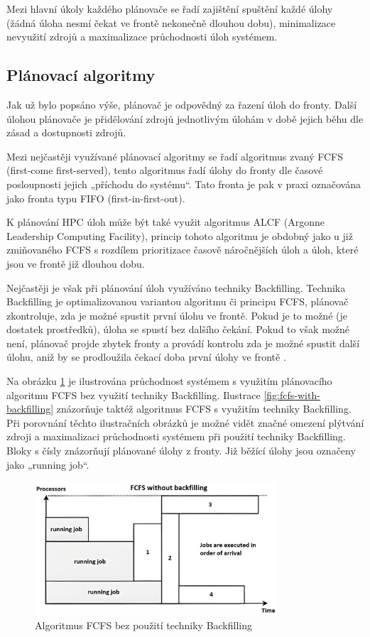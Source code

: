 Mezi hlavní úkoly každého plánovače se řadí zajištění spuštění každé úlohy (žádná úloha nesmí čekat ve frontě nekonečně dlouhou dobu), minimalizace nevyužití zdrojů a maximalizace průchodnosti úloh systémem.

\subsection{Plánovací algoritmy}
Jak už bylo popsáno výše, plánovač je odpovědný za řazení úloh do fronty. Další úlohou plánovače je přidělování zdrojů jednotlivým úlohám v době jejich běhu dle zásad a dostupnosti zdrojů. 

Mezi nejčastěji využívané plánovací algoritmy se řadí algoritmus zvaný FCFS (first-come first-served), tento algoritmus řadí úlohy do fronty dle časové posloupnosti jejich „příchodu do systému“. Tato fronta je pak v praxi označována jako fronta typu FIFO (first-in-first-out). 

K plánování HPC úloh může být také využit algoritmus ALCF (Argonne Leadership Computing Facility), princip tohoto algoritmu je obdobný jako u již zmiňovaného FCFS s rozdílem prioritizace časově náročnějších úloh a úloh, které jsou ve frontě již dlouhou dobu. 

Nejčastěji je však při plánování úloh využíváno techniky Backfilling. Technika Backfilling je optimalizovanou variantou algoritmu či principu FCFS, plánovač zkontroluje, zda je možné spustit první úlohu ve frontě. Pokud je to možné (je dostatek prostředků), úloha se spustí bez dalšího čekání. Pokud to však možné není, plánovač projde zbytek fronty a provádí kontrolu zda je možné spustit další úlohu, aniž by se prodloužila čekací doba první úlohy ve frontě \cite{pr00bfp79qnvRTQ3}.

Na obrázku \ref{fig:fcfs-without-backfilling} je ilustrována průchodnost systémem s využitím plánovacího algoritmu FCFS bez využití techniky Backfilling. Ilustrace \ref{fig:fcfs-with-backfilling} znázorňuje taktéž algoritmus FCFS s využitím techniky Backfilling. Při porovnání těchto ilustračních obrázků je možné vidět značné omezení plýtvání zdroji a maximalizaci průchodnosti systémem při použití techniky Backfilling. Bloky s čísly znázorňují plánované úlohy z fronty. Již běžící úlohy jsou označeny jako „running job“.
\newpage
\begin{figure}
	\centering
	\includegraphics[width=0.8\textwidth]{Figures/fcfs-wb.png}
	\caption{Algoritmus FCFS bez použití techniky Backfilling \cite{GomezMartin2016}}
	\label{fig:fcfs-without-backfilling}
\end{figure}

